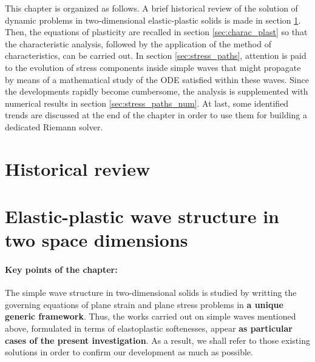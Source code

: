 This chapter is organized as follows.
A brief historical review of the solution of dynamic problems in two-dimensional elastic-plastic solids is made in section \ref{sec:review}.
Then, the equations of plasticity are recalled in section \ref{sec:charac_plast} so that the characteristic analysis, followed by the application of the method of characteristics, can be carried out.
In section \ref{sec:stress_paths}, attention is paid to the evolution of stress components inside simple waves that might propagate by means of a mathematical study of the ODE satisfied within these waves.
Since the developments rapidly become cumbersome, the analysis is supplemented with numerical results in section \ref{sec:stress_paths_num}.
At last, some identified trends are discussed at the end of the chapter in order to use them for building a dedicated Riemann solver. 

\section{Historical review}
\label{sec:review}




\section{Elastic-plastic wave structure in two space dimensions}
\paragraph*{Key points of the chapter:} The simple wave structure in two-dimensional solids is studied by writting the governing equations of plane strain and plane stress problems in \textbf{a unique generic framework}.
Thus, the works carried out on simple waves mentioned above, formulated in terms of elastoplastic softenesses, appear \textbf{as particular cases of the present investigation}.
As a result, we shall refer to those existing solutions in order to confirm our development as much as possible.

